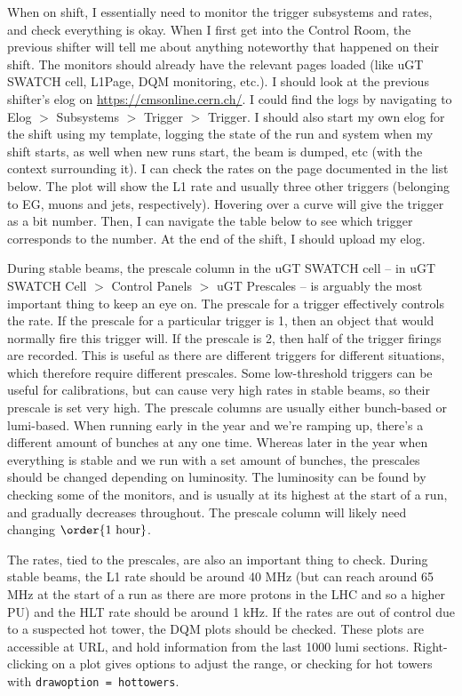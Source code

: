 When on shift, I essentially need to monitor the trigger subsystems and rates, and check everything is okay. When I first get into the Control Room, the previous shifter will tell me about anything noteworthy that happened on their shift. The monitors should already have the relevant pages loaded (like uGT SWATCH cell, L1Page, DQM monitoring, etc.). I should look at the previous shifter's elog on \url{https://cmsonline.cern.ch/}. I could find the logs by navigating to Elog $>$ Subsystems $>$ Trigger $>$ Trigger. I should also start my own elog for the shift using my template, logging the state of the run and system when my shift starts, as well when new runs start, the beam is dumped, etc (with the context surrounding it). I can check the rates on the page documented in the list below. The plot will show the L1 rate and usually three other triggers (belonging to EG, muons and jets, respectively). Hovering over a curve will give the trigger as a bit number. Then, I can navigate the table below to see which trigger corresponds to the number. At the end of the shift, I should upload my elog.

During stable beams, the prescale column in the uGT SWATCH cell -- in uGT SWATCH Cell
$>$ Control Panels $>$ uGT Prescales -- is arguably the most important thing to keep an eye on. The prescale for a trigger effectively controls the rate. If the prescale for a particular trigger is 1, then an object that would normally fire this trigger will. If the prescale is 2, then half of the trigger firings are recorded. This is useful as there are different triggers for different situations, which therefore require different prescales. Some low-threshold triggers can be useful for calibrations, but can cause very high rates in stable beams, so their prescale is set very high. The prescale columns are usually either bunch-based or lumi-based. When running early in the year and we're ramping up, there's a different amount of bunches at any one time. Whereas later in the year when everything is stable and we run with a set amount of bunches, the prescales should be changed depending on luminosity. The luminosity can be found by checking some of the monitors, and is usually at its highest at the start of a run, and gradually decreases throughout. The prescale column will likely need changing $\order{1 \text{ hour}}$.

The rates, tied to the prescales, are also an important thing to check. During stable beams, the L1 rate should be around 40 MHz (but can reach around 65 MHz at the start of a run as there are more protons in the LHC and so a higher PU) and the HLT rate should be around 1 kHz. If the rates are out of control due to a suspected hot tower, the DQM plots should be checked. These plots are accessible at URL, and hold information from the last 1000 lumi sections. Right-clicking on a plot gives options to adjust the range, or checking for hot towers with \texttt{drawoption = hottowers}.



